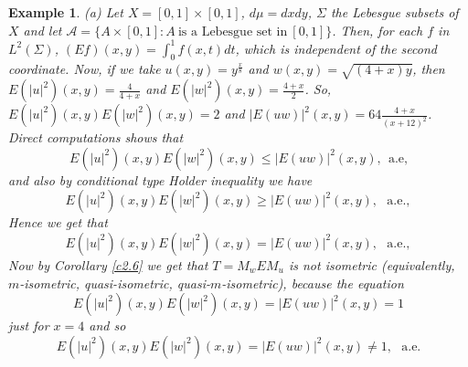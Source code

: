 \documentclass{amsart}
\newtheorem{exam}[thm]{Example}
\theoremstyle{definition}\newtheorem{defn}[thm]{Definition}
\theoremstyle{remark}
\numberwithin{equation}{section}
\begin{document}
\begin{exam} 

(a) Let $X=[0,1]\times [0,1]$, $d\mu=dxdy$,
$\Sigma$ the Lebesgue subsets of $X$ and let
$\mathcal{A}=\{A\times [0,1]: A \ \mbox{is a Lebesgue set in} \
[0,1]\}$. Then, for each $f$ in $L^2(\Sigma)$, $(Ef)(x,
y)=\int_0^1f(x,t)dt$, which is independent of the second
coordinate. Now, if we take $u(x,y)=y^{\frac{x}{8}}$ and $w(x,
y)=\sqrt{(4+x)y}$, then $E(|u|^2)(x,y)=\frac{4}{4+x}$ and
$E(|w|^2)(x,y)=\frac{4+x}{2}$. So, $E(|u|^2)(x,y)E(|w|^2)(x,y)=2$
and $|E(uw)|^2(x,y)=64\frac{4+x}{(x+12)^2}$. Direct computations
shows that 
$$E(|u|^2)(x,y)E(|w|^2)(x,y)\leq|E(uw)|^2(x,y), \ \ \text{a.e,}$$
and also by conditional type Holder inequality we have 
$$E(|u|^2)(x,y)E(|w|^2)(x,y)\geq|E(uw)|^2(x,y), \ \ \ \text{a.e.},$$ 
Hence we get that 
$$E(|u|^2)(x,y)E(|w|^2)(x,y)=|E(uw)|^2(x,y),  \ \ \ \text{a.e.}, $$
Now by Corollary \ref{c2.6} we get that $T=M_wEM_u$ is not isometric (equivalently, $m$-isometric, quasi-isometric, quasi-$m$-isometric), because the equation 
$$E(|u|^2)(x,y)E(|w|^2)(x,y)=|E(uw)|^2(x,y)=1$$
just for $x=4$ and so  
$$E(|u|^2)(x,y)E(|w|^2)(x,y)=|E(uw)|^2(x,y)\neq 1,  \ \ \ \text{a.e.}$$


\end{exam}
\end{document}
